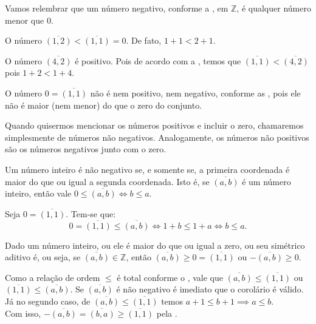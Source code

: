 \documentclass[../main.tex]{subfiles}
\begin{document}
Vamos relembrar que um número negativo, conforme a , em $\mathbb{Z}$, é qualquer número menor que $0$.
\begin{ex}
    O número $\overline{(1,2)} < \overline{(1,1)} = 0$. De fato, $1+1 < 2+1$. 
\end{ex}
\begin{ex}
    O número $\overline{(4,2)}$ é positivo. Pois de acordo com a , temos que $\overline{(1,1)} < \overline{(4,2)}$ pois 
    $1+2 < 1+4$.
\end{ex}
\begin{ex}
    O número $0 = \overline{(1,1)}$ não é nem positivo, nem negativo, conforme as , pois ele não é maior (nem menor) do que o zero do conjunto.
\end{ex}
\begin{ex}
    Quando quisermos mencionar os números positivos e incluir o zero, chamaremos simplesmente de números não negativos. Analogamente, os números não positivos são os números negativos junto com o zero.
\end{ex}

\begin{prop}\label{int-prop-coordenadaMaior}
    Um número inteiro é não negativo se, e somente se, a primeira coordenada é maior do que ou igual a segunda coordenada. 
    Isto é, se $\overline{(a,b)}$ é um número inteiro, então vale $0 \leq \overline{(a,b)}  \iff b \leq a$.
\end{prop}
\begin{dem}
    Seja $0 = \overline{(1,1)}$. Tem-se que:
    \[ 0 = \overline{(1,1)} \leq \overline{(a,b)} \iff 1+b \leq 1+a \iff b \leq a. \]
\end{dem}

\begin{corol}\label{int-corol-numeroOuSimetricoPositivo}
    Dado um número inteiro, ou ele é maior do que ou igual a zero, ou seu simétrico aditivo é, ou seja,
    se $\overline{(a,b)} \in \mathbb{Z}$, então $\overline{(a,b)} \geq 0 = \overline{(1,1)}$ ou $-\overline{(a,b)} \geq 0$.
\end{corol}
\begin{dem}
    Como a relação de ordem $\leq$ é total conforme o , vale que $\overline{(a,b)} \leq \overline{(1,1)}$ ou $\overline{(1,1)} \leq \overline{(a,b)}$. Se $\overline{(a,b)}$ é não negativo é imediato que o corolário é válido. Já no segundo caso, 
    de $\overline{(a,b)} \leq \overline{(1,1)}$ temos $a+1 \leq b+1 \implies a \leq b$. \\
    Com isso, $-\overline{(a,b)} = \overline{(b,a)} \geq \overline{(1,1)}$ pela .
\end{dem}
\end{document}
